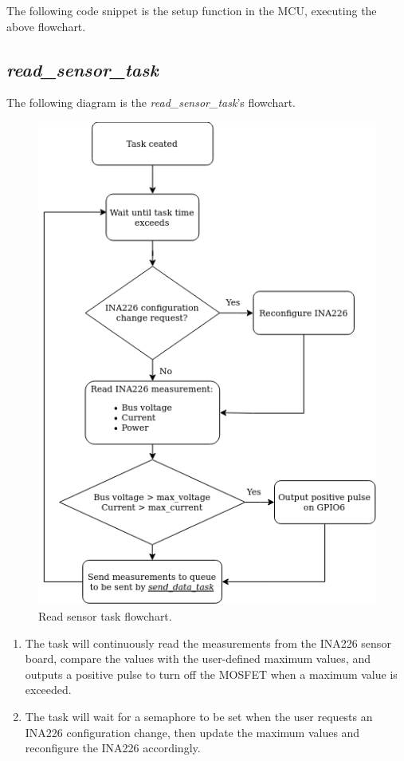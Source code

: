 \documentclass[../main.tex]{subfiles}
\begin{document}
    \justify
    The following code snippet is the setup function in the MCU, executing the above flowchart.
    

    \pagebreak
    \subsection{\textit{read\_sensor\_task}}
    The following diagram is the \textit{read\_sensor\_task}'s flowchart.

    \begin{figure}[!h]
        \centerline{\includegraphics[scale=0.6]{media/read_sensor_task_flowchart.drawio.png}}
        \caption{Read sensor task flowchart.}
        \label{fig:read_sensor_task_flowchart}
    \end{figure}

    \begin{enumerate}
        \item The task will continuously read the measurements from the INA226 sensor board, compare the values with the user-defined maximum values, and outputs a positive pulse to turn off the MOSFET when a maximum value is exceeded.
        \item The task will wait for a semaphore to be set when the user requests an INA226 configuration change, then update the maximum values and reconfigure the INA226 accordingly.
    \end{enumerate}
\end{document}
